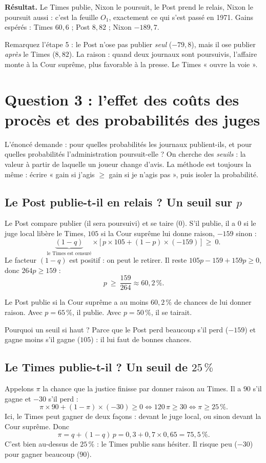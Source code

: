 \documentclass[11pt,a4paper]{article}
\theoremstyle{definition}
\begin{document}
\begin{resultat}
\textbf{Résultat.} Le Times publie, Nixon le poursuit, le Post prend le relais, Nixon le poursuit aussi : c'est la feuille $O_1$, exactement ce qui s'est passé en 1971. Gains espérés : Times $60,6$ ; Post $8,82$ ; Nixon $-189,7$.
\end{resultat}

Remarquez l'étape 5 : le Post n'ose pas publier \emph{seul} ($-79,8$), mais il ose publier \emph{après} le Times ($8,82$). La raison : quand deux journaux sont poursuivis, l'affaire monte à la Cour suprême, plus favorable à la presse. Le Times « ouvre la voie ».

\section{Question 3 : l'effet des coûts des procès et des probabilités des juges}

L'énoncé demande : pour quelles probabilités les journaux publient-ils, et pour quelles probabilités l'administration poursuit-elle ? On cherche des \emph{seuils} : la valeur à partir de laquelle un joueur change d'avis. La méthode est toujours la même : écrire « gain si j'agis $\ge$ gain si je n'agis pas », puis isoler la probabilité.

\subsection{Le Post publie-t-il en relais ? Un seuil sur $p$}
Le Post compare publier (il sera poursuivi) et se taire ($0$). S'il publie, il a $0$ si le juge local libère le Times, $105$ si la Cour suprême lui donne raison, $-159$ sinon :
\[
\underbrace{(1-q)}_{\text{le Times est censuré}}\times\big[\,p\times105+(1-p)\times(-159)\,\big]\ \ge\ 0 .
\]
Le facteur $(1-q)$ est positif : on peut le retirer. Il reste $105p-159+159p\ge0$, donc $264p\ge159$ :
\[
p\ \ge\ \frac{159}{264}\approx 60,2\,\% .
\]
\begin{simple}
Le Post publie si la Cour suprême a au moins $60,2\,\%$ de chances de lui donner raison. Avec $p=65\,\%$, il publie. Avec $p=50\,\%$, il se tairait.
\end{simple}
Pourquoi un seuil si haut ? Parce que le Post perd beaucoup s'il perd ($-159$) et gagne moins s'il gagne ($105$) : il lui faut de bonnes chances.

\subsection{Le Times publie-t-il ? Un seuil de $25\,\%$}
Appelons $\pi$ la chance que la justice finisse par donner raison au Times. Il a $90$ s'il gagne et $-30$ s'il perd :
\[
\pi\times90+(1-\pi)\times(-30)\ge0\iff 120\,\pi\ge30\iff \pi\ge25\,\% .
\]
Ici, le Times peut gagner de deux façons : devant le juge local, ou sinon devant la Cour suprême. Donc
\[
\pi=q+(1-q)\,p=0,3+0,7\times0,65=75,5\,\% .
\]
C'est bien au-dessus de $25\,\%$ : le Times publie sans hésiter. Il risque peu ($-30$) pour gagner beaucoup ($90$).
\end{document}

